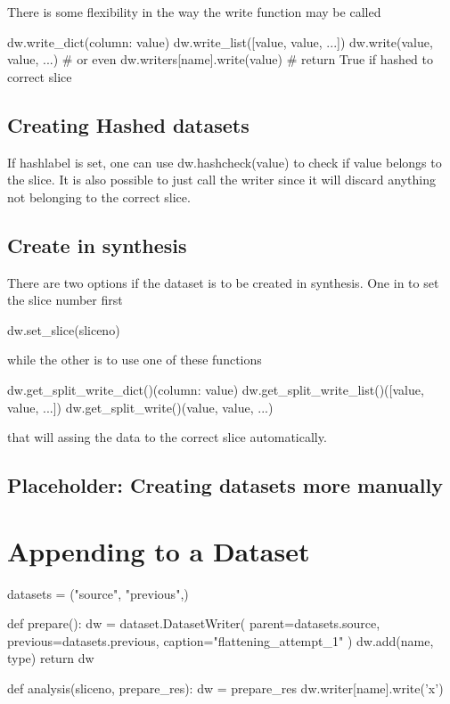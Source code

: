There is some flexibility in the way the write function may be called

\begin{python}
  dw.write_dict({column: value})
  dw.write_list([value, value, ...])
  dw.write(value, value, ...)
  # or even
  dw.writers[name].write(value)  # return True if hashed to correct slice
\end{python}


\subsection{Creating Hashed datasets}
If hashlabel is set, one can use dw.hashcheck(value) to check if value
belongs to the slice.  It is also possible to just call the writer
since it will discard anything not belonging to the correct slice.



\subsection{Create in synthesis}

There are two options if the dataset is to be created in synthesis.
One in to set the slice number first

\begin{python}
  dw.set_slice(sliceno)
\end{python}
while the other is to use one of these functions

\begin{python}
  dw.get_split_write_dict()({column: value})
  dw.get_split_write_list()([value, value, ...])
  dw.get_split_write()(value, value, ...)
\end{python}
that will assing the data to the correct slice automatically.

\subsection{Placeholder:  Creating datasets more manually}


\section{Appending to a Dataset}
\begin{python}
datasets = ("source", "previous",)

def prepare():
  dw = dataset.DatasetWriter(
    parent=datasets.source,
    previous=datasets.previous,
    caption="flattening_attempt_1"
  )
  dw.add(name, type)
  return dw

def analysis(sliceno, prepare_res):
  dw = prepare_res
  dw.writer[name].write('x')
\end{python}



  
